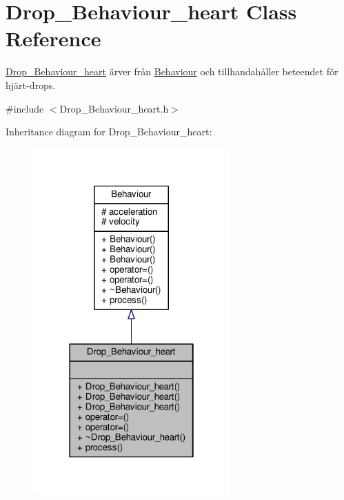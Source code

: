 \hypertarget{classDrop__Behaviour__heart}{\section{Drop\+\_\+\+Behaviour\+\_\+heart Class Reference}
\label{classDrop__Behaviour__heart}
}


\hyperlink{classDrop__Behaviour__heart}{Drop\+\_\+\+Behaviour\+\_\+heart} ärver från \hyperlink{classBehaviour}{Behaviour} och tillhandahåller beteendet för hjärt-\/drops.  




{\ttfamily \#include $<$Drop\+\_\+\+Behaviour\+\_\+heart.\+h$>$}



Inheritance diagram for Drop\+\_\+\+Behaviour\+\_\+heart\+:\nopagebreak
\begin{figure}[H]
\begin{center}
\leavevmode
\includegraphics[width=214pt]{classDrop__Behaviour__heart__inherit__graph}
\end{center}
\end{figure}


